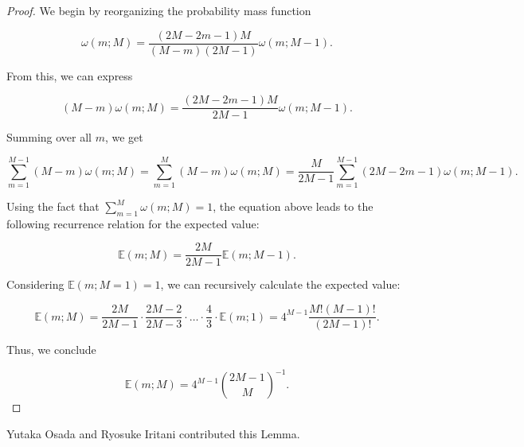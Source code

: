 \documentclass[11pt, class=article, crop=false]{standalone}
\begin{document}
\begin{proof}
We begin by reorganizing the probability mass function

\begin{equation}
    \omega(m; M) = \frac{(2M - 2m - 1) M}{(M - m)(2M - 1)} \omega(m; M - 1).
\end{equation}

From this, we can express

\begin{equation}
    (M - m) \omega(m; M) = \frac{(2M - 2m - 1) M}{2M - 1} \omega(m; M - 1).
\end{equation}

Summing over all $m$, we get

\begin{equation}
    \sum_{m = 1}^{M - 1} (M - m) \omega(m; M)
    = \sum_{m = 1}^{M} (M - m) \omega(m; M)
    = \frac{M}{2M - 1} \sum_{m = 1}^{M - 1} (2M - 2m - 1) \omega(m; M - 1).
\end{equation}

Using the fact that $\sum_{m = 1}^{M} \omega(m; M) = 1$, the equation above leads to the following recurrence relation for the expected value:

\begin{equation}
    \mathbb{E}(m; M) = \frac{2M}{2M - 1} \mathbb{E}(m; M - 1).
\end{equation}

Considering $\mathbb{E}(m; M = 1) = 1$, we can recursively calculate the expected value:

\begin{equation}
    \mathbb{E}(m; M) = \frac{2M}{2M - 1} \cdot \frac{2M - 2}{2M - 3} \cdot \ldots \cdot \frac{4}{3} \cdot \mathbb{E}(m; 1) = 4^{M - 1} \frac{M!(M - 1)!}{(2M - 1)!}.
\end{equation}

Thus, we conclude

\begin{equation}
    \mathbb{E}(m; M) = 4^{M - 1} \binom{2M - 1}{M}^{-1}.
\end{equation}
\end{proof}

Yutaka Osada and Ryosuke Iritani contributed this Lemma.
\end{document}
